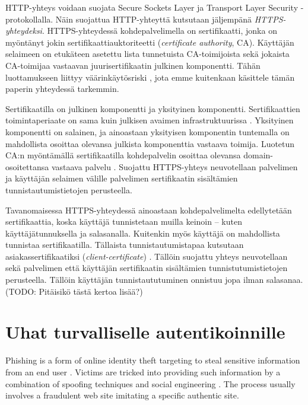 \documentclass[english,gradu]{tktltiki}
\begin{document}
HTTP-yhteys voidaan suojata Secure Sockets Layer ja Transport Layer Security -protokollalla. Näin suojattua HTTP-yhteyttä kutsutaan jäljempänä \emph{HTTPS-yhteydeksi}. HTTPS-yhteydessä kohdepalvelimella on sertifikaatti, jonka on myöntänyt jokin sertifikaattiauktoriteetti (\emph{certificate authority}, CA). Käyttäjän selaimeen on etukäteen asetettu lista tunnetuista CA-toimijoista sekä jokaista CA-toimijaa vastaavan juurisertifikaatin julkinen komponentti. Tähän luottamukseen liittyy väärinkäytösriski \cite{certified_lies, eff_ssliverse}, jota emme kuitenkaan käsittele tämän paperin yhteydessä tarkemmin.

Sertifikaatilla on julkinen komponentti ja yksityinen komponentti.
Sertifikaattien toimintaperiaate on sama kuin julkisen avaimen infrastruktuurissa \cite{nist_pki_intro, henry_story_foaf_ssl}.
Yksityinen komponentti on salainen, ja ainoastaan yksityisen komponentin tuntemalla on mahdollista osoittaa olevansa julkista komponenttia vastaava toimija. Luotetun CA:n myöntämällä sertifikaatilla kohdepalvelin osoittaa olevansa domain-osoitettansa vastaava palvelu \cite{authenticated_names}.
Suojattu HTTPS-yhteys neuvotellaan palvelimen ja käyttäjän selaimen välille palvelimen sertifikaatin sisältämien tunnistautumistietojen perusteella.

Tavanomaisessa HTTPS-yhteydessä ainoastaan kohdepalvelimelta edellytetään sertifikaattia, koska käyttäjä tunnistetaan muilla keinoin -- kuten käyttäjätunnuksella ja salasanalla.
Kuitenkin myös käyttäjä on mahdollista tunnistaa sertifikaatilla. Tällaista tunnistautumistapaa kutsutaan asiakassertifikaatiksi (\emph{client-certificate}) \cite{henry_story_foaf_ssl}.
Tällöin suojattu yhteys neuvotellaan sekä palvelimen että käyttäjän sertifikaatin sisältämien tunnistutumistietojen perusteella.
Tällöin käyttäjän tunnistaututuminen onnistuu jopa ilman salasanaa. (TODO: Pitäisikö tästä kertoa lisää?)




\section{Uhat turvalliselle autentikoinnille}

    Phishing is a form of online identity theft targeting to steal sensitive information from an end user   \cite{phishing_attacks_and_solutions_2007, why_phishing_works_06, suspectibility_to_phishing_2006}. Victims are tricked into providing such information by a combination of spoofing techniques and social engineering \cite{visual_similarity_phishing_2008}. The process usually involves a fraudulent web site imitating a specific authentic site.
\end{document}
